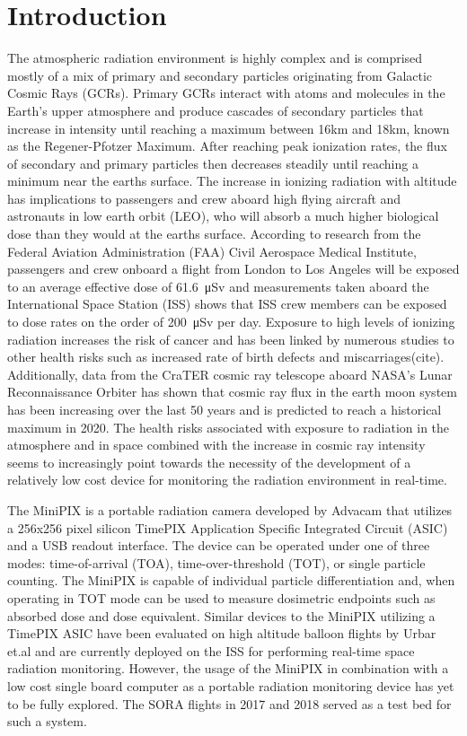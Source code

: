 \section{Introduction}
\label{Introduction}
The atmospheric radiation environment is highly complex and is comprised mostly of a mix of primary and secondary particles originating from Galactic Cosmic Rays (GCRs). Primary GCRs interact with atoms and molecules in the Earth's upper atmosphere and produce cascades of secondary particles that increase in intensity until reaching a maximum between 16km and 18km, known as the Regener-Pfotzer Maximum. After reaching peak ionization rates, the flux of secondary and primary particles then decreases steadily until reaching a minimum near the earths surface. The increase in ionizing radiation with altitude has implications to passengers and crew aboard high flying aircraft and astronauts in low earth orbit (LEO), who will absorb a much higher biological dose than they would at the earths surface. According to research from the Federal Aviation Administration (FAA) Civil Aerospace Medical Institute, passengers and crew onboard a flight from London to Los Angeles will be exposed to an average effective dose of \SI{61.6}{\micro\sievert}\cite{faa} and measurements taken aboard the International Space Station (ISS) shows that ISS crew members can be exposed to dose rates on the order of \SI{200}{\micro\sievert} per day. Exposure to high levels of ionizing radiation increases the risk of cancer and has been linked by numerous studies to other health risks such as increased rate of birth defects and miscarriages(cite). Additionally, data from the CraTER cosmic ray telescope aboard NASA’s Lunar Reconnaissance Orbiter has shown that cosmic ray flux in the earth moon system has been increasing over the last 50 years and is predicted to reach a historical maximum in 2020\cite{crater}. The health risks associated with exposure to radiation in the atmosphere and in space combined with the increase in cosmic ray intensity seems to increasingly point towards the necessity of the development of a relatively low cost device for monitoring the radiation environment in real-time.

The MiniPIX is a portable radiation camera developed by Advacam that utilizes a 256x256 pixel silicon TimePIX Application Specific Integrated Circuit (ASIC) and a USB readout interface. The device can be operated under one of three modes: time-of-arrival (TOA), time-over-threshold (TOT), or single particle counting. The MiniPIX is capable of individual particle differentiation and, when operating in TOT mode can be used to measure dosimetric endpoints such as absorbed dose and dose equivalent. Similar devices to the MiniPIX utilizing a TimePIX ASIC have been evaluated on high altitude balloon flights by Urbar et.al\cite{bexus} and are currently deployed on the ISS for performing real-time space radiation monitoring\cite{timepixiss}. However, the usage of the MiniPIX in combination with a low cost single board computer as a portable radiation monitoring device has yet to be fully explored. The SORA flights in 2017 and 2018 served as a test bed for such a system.

